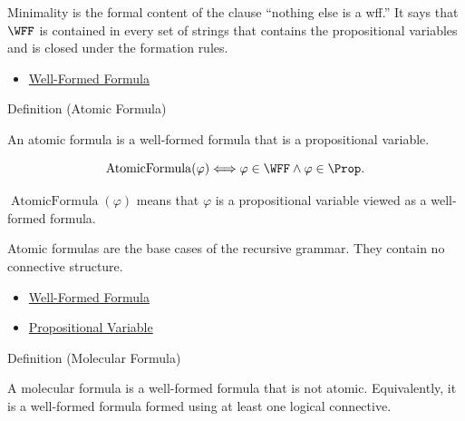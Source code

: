 \begin{remark*}[Interpretation]
Minimality is the formal content of the clause ``nothing else is a wff.'' It says
that \(\WFF\) is contained in every set of strings that contains the
propositional variables and is closed under the formation rules.
\end{remark*}

\begin{dependencies}
\begin{itemize}
  \item \hyperref[def:well-formed-formula]{Well-Formed Formula}
\end{itemize}
\end{dependencies}
\begin{definitionbox}{Definition (Atomic Formula)}
\begin{definition}
\label{def:atomic-formula-propositional-logic}
An atomic formula is a well-formed formula that is a propositional variable.
\end{definition}
\end{definitionbox}

\begin{remark*}
\[
\operatorname{AtomicFormula}(\varphi)
\Longleftrightarrow
\varphi\in\WFF\land\varphi\in\Prop.
\]
\end{remark*}

\begin{remark*}
\(\operatorname{AtomicFormula}(\varphi)\) means that \(\varphi\) is a propositional variable viewed as a well-formed formula.
\end{remark*}

\begin{remark*}[Interpretation]
Atomic formulas are the base cases of the recursive grammar. They contain no connective structure.
\end{remark*}

\begin{dependencies}
\begin{itemize}
  \item \hyperref[def:well-formed-formula]{Well-Formed Formula}
  \item \hyperref[def:propositional-variable]{Propositional Variable}
\end{itemize}
\end{dependencies}
\begin{definitionbox}{Definition (Molecular Formula)}
\begin{definition}
\label{def:molecular-formula-propositional-logic}
A molecular formula is a well-formed formula that is not atomic. Equivalently, it is a well-formed formula formed using at least one logical connective.
\end{definition}
\end{definitionbox}

